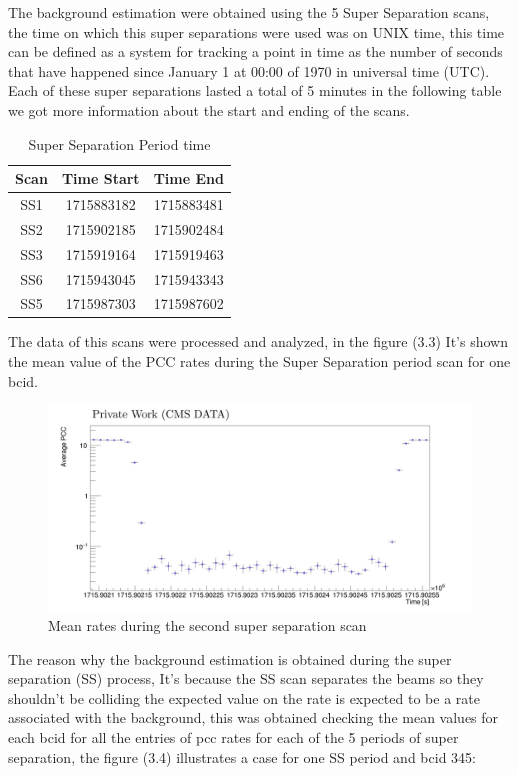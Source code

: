 The background estimation were obtained using the 5 Super Separation scans, the time on which this super separations were used was on UNIX time, this time can be defined as a system for tracking a point in time as the number of seconds that have happened since January 1 at 00:00 of 1970 in universal time (UTC). Each of these super separations lasted a total of 5 minutes in the following table we got more information about the start and ending of the scans. 

\begin{table} [H]
\begin{center}
\caption{Super Separation Period time}
\begin{tabular}{|c c c|} 
 \hline
 Scan & Time Start & Time End  \\ [0.5ex] 
 \hline\hline
 SS1 & 1715883182 & 1715883481  \\ 
 \hline
 SS2 & 1715902185 & 1715902484  \\
 \hline
 SS3 & 1715919164 & 1715919463 \\
 \hline
 SS6 & 1715943045 & 1715943343  \\
 \hline
 SS5 & 1715987303 & 1715987602  \\ [1.0ex]
 \hline
\end{tabular}
\end{center}
\end{table}

The data of this scans were processed and analyzed, in the figure  (3.3) It's shown the mean value of the PCC rates during the Super Separation period scan for one bcid.

\begin{figure}[H]
    \centering
    \includegraphics[width=1\textwidth]{SS1.jpeg}
    \caption{Mean rates during the second super separation scan}
    \label{fig:SS1}
\end{figure}

The reason why the background estimation is obtained during the super separation (SS) process, It's because the SS scan separates the beams so they shouldn't be colliding the expected value on the rate is expected to be a rate associated with the background, this was obtained checking the mean values for each bcid for all the entries of pcc rates for each of the 5 periods of super separation, the figure (3.4) illustrates a case for one SS period and bcid 345:

